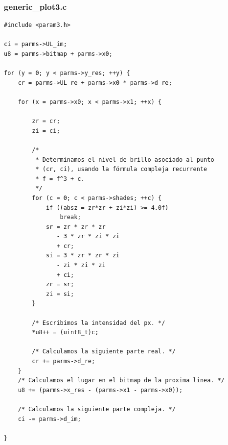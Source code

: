 \documentclass[a4paper,10pt]{article}
\begin{document}
\subsubsection{generic_plot3.c}
\begin{verbatim}
#include <param3.h>

ci = parms->UL_im;
u8 = parms->bitmap + parms->x0;

for (y = 0; y < parms->y_res; ++y) {
	cr = parms->UL_re + parms->x0 * parms->d_re; 

	for (x = parms->x0; x < parms->x1; ++x) {
		
		zr = cr;
		zi = ci;

		/*
		 * Determinamos el nivel de brillo asociado al punto
		 * (cr, ci), usando la fórmula compleja recurrente 
		 * f = f^3 + c.
		 */
		for (c = 0; c < parms->shades; ++c) {
			if ((absz = zr*zr + zi*zi) >= 4.0f)
				break;
			sr = zr * zr * zr
			   - 3 * zr * zi * zi
			   + cr;
			si = 3 * zr * zr * zi
			   - zi * zi * zi
			   + ci;
			zr = sr;
			zi = si;
		}

		/* Escribimos la intensidad del px. */
		*u8++ = (uint8_t)c;

		/* Calculamos la siguiente parte real. */
		cr += parms->d_re;
	}
	/* Calculamos el lugar en el bitmap de la proxima linea. */
	u8 += (parms->x_res - (parms->x1 - parms->x0));

	/* Calculamos la siguiente parte compleja. */
	ci -= parms->d_im;
	
}

\end{verbatim}
\end{document}
